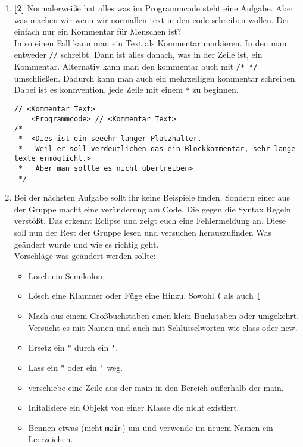 \begin{enumerate}
    \item \textbf{[2]} Normalerweiße hat alles was im Programmcode steht eine Aufgabe. Aber was machen wir wenn wir normallen text in den code schreiben wollen. Der einfach nur ein Kommentar für Menschen ist?\\
          In so einen Fall kann man ein Text als Kommentar markieren. In den man entweder \lstinline[breaklines=false]{//} schreibt. Dann ist alles danach, was in der Zeile ist, ein Kommentar.
          Alternativ kann man den kommentar auch mit \lstinline[breaklines=false]{/* */} umschließen. Dadurch kann man auch ein mehrzeiligen kommentar schreiben. Dabei ist es konnvention, jede Zeile mit einem \textcolor{javagreen}{\texttt{*}} zu beginnen.
          \begin{lstlisting}[title=\textbf{Kommentar Syntax},firstnumber=11]
// <Kommentar Text>
    <Programmcode> // <Kommentar Text>
/*
 *  <Dies ist ein seeehr langer Platzhalter. 
 *   Weil er soll verdeutlichen das ein Blockkommentar, sehr lange texte ermöglicht.>
 *   Aber man sollte es nicht übertreiben>
 */
        \end{lstlisting}
    \item Bei der nächsten Aufgabe sollt ihr keine Beispiele finden. Sondern einer aus der Gruppe macht eine veränderung am Code. Die gegen die Syntax Regeln verstößt. Das erkennt Eclipse und zeigt euch eine Fehlermeldung an. Diese soll nun der Rest der Gruppe lesen und versuchen herauszufinden Was geändert wurde und wie es richtig geht.\\
          Vorschläge was geändert werden sollte:
          \begin{itemize}
              \item Lösch ein Semikolon
              \item Lösch eine Klammer oder Füge eine Hinzu. Sowohl \lstinline{(} als auch \lstinline{{}
              \item Mach aus einem Großbuchstaben einen klein Buchstaben oder umgekehrt. Versucht es mit Namen und auch mit Schlüsselworten wie class oder new.
              \item Ersetz ein \lstinline{"} durch ein \lstinline{'}.
              \item Lass ein \lstinline{"} oder ein \lstinline{'} weg.
              \item verschiebe eine Zeile aus der main in den Bereich außerhalb der main.
              \item Initalisiere ein Objekt von einer Klasse die nicht existiert.
              \item Bennen etwas (nicht \lstinline{main}) um und verwende im neuem Namen ein Leerzeichen.

\end{itemize}
\end{enumerate}
